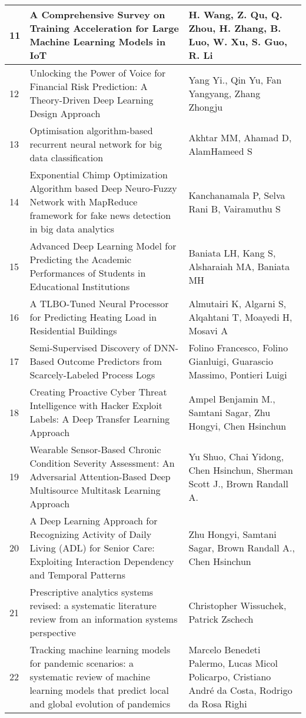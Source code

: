 \begin{landscape}
\begin{longtable}{|p{0.5cm}|p{9cm}|p{7cm}|}
    11 & A Comprehensive Survey on Training Acceleration for Large Machine Learning Models in IoT & H. Wang, Z. Qu, Q. Zhou, H. Zhang, B. Luo, W. Xu, S. Guo, R. Li \\
    \hline
    12 & Unlocking the Power of Voice for Financial Risk Prediction: A Theory-Driven Deep Learning Design Approach & Yang Yi., Qin Yu, Fan Yangyang, Zhang Zhongju \\
    \hline
    13 & Optimisation algorithm-based recurrent neural network for big data classification & Akhtar MM, Ahamad D, AlamHameed S \\
    \hline
    14 & Exponential Chimp Optimization Algorithm based Deep Neuro‐Fuzzy Network with MapReduce framework for fake news detection in big data analytics & Kanchanamala P, Selva Rani B, Vairamuthu S \\
    \hline
    15 & Advanced Deep Learning Model for Predicting the Academic Performances of Students in Educational Institutions & Baniata LH, Kang S, Alsharaiah MA, Baniata MH \\
    \hline
    16 & A TLBO-Tuned Neural Processor for Predicting Heating Load in Residential Buildings & Almutairi K, Algarni S, Alqahtani T, Moayedi H, Mosavi A \\
    \hline
    17 & Semi-Supervised Discovery of DNN-Based Outcome Predictors from Scarcely-Labeled Process Logs & Folino Francesco, Folino Gianluigi, Guarascio Massimo, Pontieri Luigi \\
    \hline
    18 & Creating Proactive Cyber Threat Intelligence with Hacker Exploit Labels: A Deep Transfer Learning Approach & Ampel Benjamin M., Samtani Sagar, Zhu Hongyi, Chen Hsinchun \\
    \hline
    19 & Wearable Sensor-Based Chronic Condition Severity Assessment: An Adversarial Attention-Based Deep Multisource Multitask Learning Approach & Yu Shuo, Chai Yidong, Chen Hsinchun, Sherman Scott J., Brown Randall A. \\
    \hline
    20 & A Deep Learning Approach for Recognizing Activity of Daily Living (ADL) for Senior Care: Exploiting Interaction Dependency and Temporal Patterns & Zhu Hongyi, Samtani Sagar, Brown Randall A., Chen Hsinchun \\
    \hline
    21 & Prescriptive analytics systems revised: a systematic literature review from an information systems perspective & Christopher Wissuchek, Patrick Zschech \\
    \hline
    22 & Tracking machine learning models for pandemic scenarios: a systematic review of machine learning models that predict local and global evolution of pandemics & Marcelo Benedeti Palermo, Lucas Micol Policarpo, Cristiano André da Costa, Rodrigo da Rosa Righi \\

\end{longtable}
\end{landscape}

